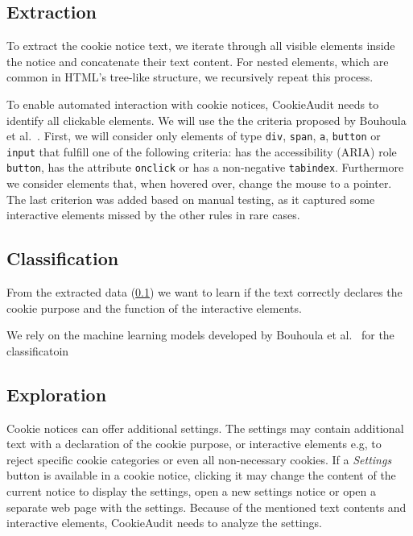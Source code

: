 \subsection{Extraction} \label{subsec:extraction}
To extract the cookie notice text, we iterate through all visible elements inside the notice and concatenate their text content.
For nested elements, which are common in HTML's tree-like structure, we recursively repeat this process.

To enable automated interaction with cookie notices, CookieAudit needs to identify all clickable elements.
We will use the the criteria proposed by Bouhoula et al.~\cite{bouhoula2023automated}.
First, we will consider only elements of type \verb|div|, \verb|span|, \verb|a|, \verb|button| or \verb|input| that fulfill one of the following criteria: 
has the accessibility (ARIA) role \verb|button|, 
has the attribute \verb|onclick| or
has a non-negative \verb|tabindex|.
Furthermore we consider elements that, when hovered over, change the mouse to a pointer.
The last criterion was added based on manual testing, as it captured some interactive elements missed by the other rules in rare cases.

\subsection{Classification}
From the extracted data (\cref{subsec:extraction}) we want to learn if the text correctly declares the cookie purpose and the function of the interactive elements. 

We rely on the machine learning models developed by Bouhoula et al.~\cite{bouhoula2023automated} for the classificatoin

\subsection{Exploration}
Cookie notices can offer additional settings.
The settings may contain additional text with a declaration of the cookie purpose, or interactive elements e.g, to reject specific cookie categories or even all non-necessary cookies.
If a \emph{Settings} button is available in a cookie notice, clicking it may change the content of the current notice to display the settings, open a new settings notice or open a separate web page with the settings.
Because of the mentioned text contents and interactive elements, CookieAudit needs to analyze the settings.

